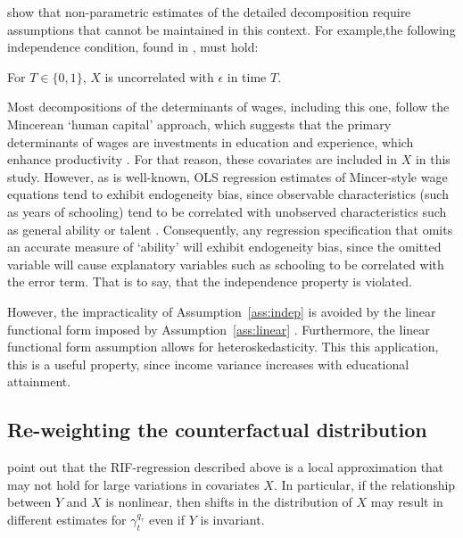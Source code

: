\citep[p.27]{Fortin2011} show that non-parametric estimates of the detailed decomposition require assumptions that cannot be maintained in this context. For example,the following independence condition, found in \citet{Matzkin2003}, must hold:
\begin{assumption}[Independence]\label{ass:indep}
  For $T\in\{0,1\}$, $X$ is uncorrelated with $\epsilon$ in time $T$.
\end{assumption}
Most decompositions of the determinants of wages, including this one, follow the Mincerean `human capital' approach, which suggests that the primary determinants of wages are investments in education and experience, which enhance productivity \citep{Mincer1962}. For that reason, these covariates are included in $X$ in this study. However, as is well-known, OLS regression estimates of Mincer-style wage equations tend to exhibit endogeneity bias, since observable characteristics (such as years of schooling) tend to be correlated with unobserved characteristics such as general ability or talent \citep{Card1999}. Consequently, any regression specification that omits an accurate measure of `ability' will exhibit endogeneity bias, since the omitted variable will cause explanatory variables such as schooling to be correlated with the error term. That is to say, that the independence property is violated.

However, the impracticality of Assumption~\ref{ass:indep} is avoided by the linear functional form imposed by Assumption~\ref{ass:linear} \citep[p.28]{Fortin2011}. Furthermore, the linear functional form assumption allows for heteroskedasticity. This this application, this is a useful property, since income variance increases with educational attainment.

\subsection{Re-weighting the counterfactual distribution}\label{sec:reweight}

\citet[p.19]{Firpo2011} point out that the RIF-regression described above is a local approximation that may not hold for large variations in covariates $X$. In particular, if the relationship between $Y$ and $X$ is nonlinear, then shifts in the distribution of $X$ may result in different estimates for $\gamma^{q_\tau}_t$ even if $Y$ is invariant. 

